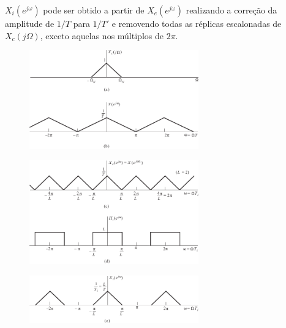 \begin{frame}[allowframebreaks]
  $X_i(e^{j\omega})$ pode ser obtido a partir de $X_e(e^{j\omega})$ realizando a correção da
  amplitude de $1/T$ para $1/T'$ e removendo todas as réplicas escalonadas de $X_c(j\Omega)$,
  exceto aquelas nos múltiplos de $2\pi$.

        \begin{figure}[h!]
        \centering
        \includegraphics[width=0.65\textwidth]{images/fig424ab.pdf}
        \label{fig:fig424ab}
        \end{figure}

        \begin{figure}[h!]
        \centering
        \includegraphics[width=0.65\textwidth]{images/fig424cd.pdf}
        \label{fig:fig424cd}
        \end{figure}

        \begin{figure}[h!]
        \centering
        \includegraphics[width=0.65\textwidth]{images/fig424e.pdf}
        \label{fig:fig424e}
        \end{figure}


\end{frame}
